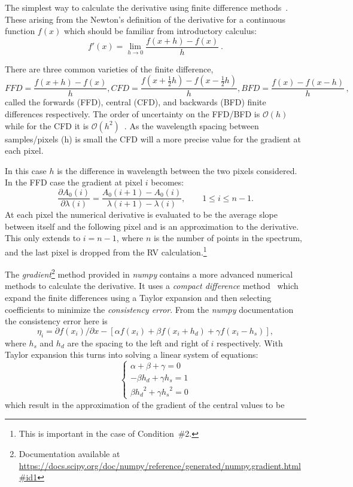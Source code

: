 {The simplest way to calculate the derivative using finite difference methods~\citep{quarteroni_numerical_2000}.
These arising from the Newton's definition of the derivative for a continuous function \(f(x)\) which should be familiar from introductory calculus:
\[f'(x) = \lim_{h \to 0} \frac{f(x+h)-f(x)}{h}~.\]

There are three common varieties of the finite difference,
\begin{equation}
 {FFD} = \frac{f(x+h)-f(x)}{h}, {CFD}=\frac{f(x+\frac{1}{2}h)-f(x-\frac{1}{2}h)}{h}, {BFD}=\frac{f(x)-f(x-h)}{h}\,,
\end{equation}
called the forwards ({FFD}), central ({CFD}), and backwards ({BFD}) finite differences respectively.
The order of uncertainty on the {FFD}/{BFD} is \(\mathcal{O}(h)\) while for the {CFD} it is \(\mathcal{O}({h}^{2})\)~\citep{quarteroni_numerical_2000}.
As the wavelength spacing between samples/pixels (h) is small the {CFD} will a more precise value for the gradient at each pixel.

In this case \(h\) is the difference in wavelength between the two pixels considered.
In the {FFD} case the gradient at pixel \(i\) becomes:
\begin{equation}
\frac{\partial A_0(i)}{\partial\lambda(i)} = \frac{A_0(i+1) - A_0(i)}{\lambda(i+1)-\lambda(i)}, \hspace{2em} 1 \leq i \leq n-1.
\label{eqn:ffd_precision}
\end{equation}
At each pixel the numerical derivative is evaluated to be the average slope between itself and the following pixel and is an approximation to the derivative.
This only extends to \(i= n-1\), where \(n\) is the number of points in the spectrum, and the last pixel is dropped from the {RV} calculation.\footnote{This is important in the case of Condition~\#2.}


The \emph{gradient}\footnote{Documentation available at \href{https://docs.scipy.org/doc/numpy/reference/generated/numpy.gradient.html\#id1 }{https://docs.scipy.org/doc/numpy/reference/generated/numpy.gradient.html\#id1}}  method provided in \emph{numpy} contains a more advanced numerical methods to calculate the derivative.
It uses a \textit{compact difference} method~\citep{quarteroni_numerical_2000} which expand the finite differences using a Taylor expansion and then selecting coefficients to minimize the \textit{consistency error}.
From the \emph{numpy} documentation the consistency error here is \[\eta_i = \partial{f(x_i)}/\partial{x} -  [\alpha f(x_i) + \beta f(x_i +h_d) + \gamma f(x_i - h_s)],\] where \(h_s\) and \(h_d\) are the spacing to the left and right of \(i\) respectively.
With Taylor expansion this turns into solving a linear system of equations:
\[\begin{cases}
         \alpha + \beta + \gamma = 0\\
         -\beta {h_d} + \gamma {h_s} = 1\\
         \beta {h_{d}}^{2} + \gamma {h_{s}}^{2} = 0
    \end{cases}
\]
which result in the approximation of the gradient of the central values to be

}
